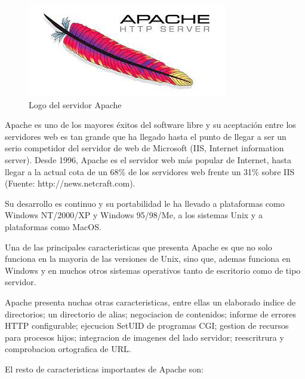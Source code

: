 \begin{figure}[h]
    \centering
    \includegraphics{imagenes/apache_logo.jpg}
    \caption{Logo del servidor Apache}
    \label{fig:logoapache}
\end{figure}

Apache es uno de los mayores éxitos del software libre y su aceptación entre los servidores web es tan grande que ha llegado hasta el punto de llegar a ser un serio competidor del servidor de web de Microsoft (IIS, Internet information server). Desde 1996, Apache es el servidor web más popular de Internet, hasta llegar a la actual cota de un 68\% de los servidores web frente un 31\% sobre IIS (Fuente: http://news.netcraft.com).

 Su desarrollo es continuo y su portabilidad le ha llevado a plataformas como Windows NT/2000/XP y Windows 95/98/Me,
a los sistemas Unix y a plataformas como MacOS. 

Una de las principales caracteristicas que presenta Apache es que no solo funciona en la mayoria de las versiones de Unix, sino que, ademas funciona en Windows y en muchos otros sistemas operativos tanto de escritorio como de tipo servidor.

Apache presenta nuchas otras caracteristicas, entre ellas un elaborado indice de directorios; un directorio de alias; negociacion de contenidos; informe de errores HTTP configurable; ejecucion SetUID de programas CGI; gestion de recursos para procesos hijos; integracion de imagenes del lado servidor; reescritrura y comprobacion ortografica de URL.

El resto de caracteristicas importantes de Apache son:

